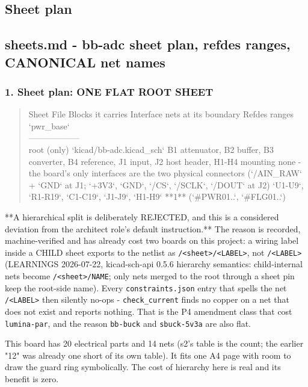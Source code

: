 \documentclass[11pt,a4paper]{article}
\begin{document}
\subsection*{Sheet plan}
\subsection*{sheets.md - bb-adc sheet plan, refdes ranges, CANONICAL net names}
\subsubsection*{1. Sheet plan: ONE FLAT ROOT SHEET}
\begin{quote}\small\ttfamily\raggedright
\textbar{} Sheet \textbar{} File \textbar{} Blocks it carries \textbar{} Interface nets at its boundary \textbar{} Refdes ranges \textbar{} `pwr\_base` \textbar{}\\
\textbar{}---\textbar{}---\textbar{}---\textbar{}---\textbar{}---\textbar{}---\textbar{}\\
\textbar{} root (only) \textbar{} `kicad/bb-adc.kicad\_sch` \textbar{} B1 attenuator, B2 buffer, B3 converter, B4 reference, J1 input, J2 host header, H1-H4 mounting \textbar{} none - the board's only interfaces are the two physical connectors (`/AIN\_RAW` + `GND` at J1; `+3V3`, `GND`, `/CS`, `/SCLK`, `/DOUT` at J2) \textbar{} `U1-U9`, `R1-R19`, `C1-C19`, `J1-J9`, `H1-H9` \textbar{} {*}{*}1{*}{*} (`\#PWR01..`, `\#FLG01..`) \textbar{}
\end{quote}
{*}{*}A hierarchical split is deliberately REJECTED, and this is a considered deviation from the architect role's default instruction.{*}{*} The reason is recorded, machine-verified and has already cost two boards on this project: a wiring label inside a CHILD sheet exports to the netlist as \texttt{/\textless{}sheet\textgreater{}/\textless{}LABEL\textgreater{}}, not \texttt{/\textless{}LABEL\textgreater{}} (LEARNINGS 2026-07-22, kicad-sch-api 0.5.6 hierarchy semantics: child-internal nets become \texttt{/\textless{}sheet\textgreater{}/NAME}; only nets merged to the root through a sheet pin keep the root-side name). Every \texttt{constraints.json} entry that spells the net \texttt{/\textless{}LABEL\textgreater{}} then silently no-ops - \texttt{check\_current} finds no copper on a net that does not exist and reports nothing. That is the P4 amendment class that cost \texttt{lumina-par}, and the reason \texttt{bb-buck} and \texttt{sbuck-5v3a} are also flat.

This board has 20 electrical parts and 14 nets (s2's table is the count; the earlier "12" was already one short of its own table). It fits one A4 page with room to draw the guard ring symbolically. The cost of hierarchy here is real and its benefit is zero.
\end{document}
